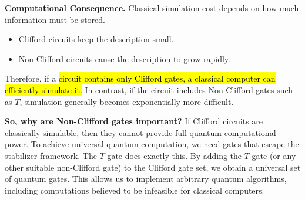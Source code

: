 \highspace
\textcolor{Green3}{ \textbf{Computational Consequence.}} Classical simulation cost depends on how much information must be stored.
\begin{itemize}
    \item Clifford circuits keep the description small.
    \item Non-Clifford circuits cause the description to grow rapidly.
\end{itemize}
Therefore, if a \hl{circuit contains only Clifford gates, a classical computer can efficiently simulate it.} In contrast, if the circuit includes Non-Clifford gates such as $T$, simulation generally becomes exponentially more difficult.

\highspace
\textcolor{Green3}{ \textbf{So, why are Non-Clifford gates important?}} If Clifford circuits are classically simulable, then they cannot provide full quantum computational power. To achieve universal quantum computation, we need gates that escape the stabilizer framework. The $T$ gate does exactly this. By adding the $T$ gate (or any other suitable non-Clifford gate) to the Clifford gate set, we obtain a universal set of quantum gates. This allows us to implement arbitrary quantum algorithms, including computations believed to be infeasible for classical computers.